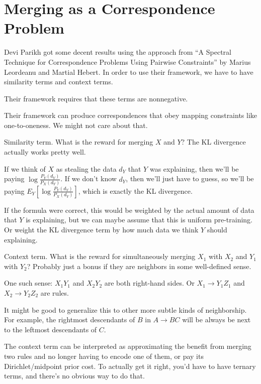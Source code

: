 \section{Merging as a Correspondence Problem}

Devi Parikh got some decent results using the approach from ``A
Spectral Technique for Correspondence Problems Using Pairwise
Constraints'' by Marius Leordeanu and Martial Hebert. In order to use
their framework, we have to have similarity terms and context terms.

Their framework requires that these terms are nonnegative. 

Their framework can produce correspondences that obey mapping
constraints like one-to-oneness. We might not care about that.

\bitem
\item Similarity term. What is the reward for merging $X$ and $Y$? 
  The KL divergence actually works pretty well.

  If we think of $X$ as stealing the data $d_Y$ that $Y$ was
  explaining, then we'll be paying $\log
  \frac{P_Y(d_Y)}{P_X(d_Y)}$. If we don't know $d_Y$, then we'll just
  have to guess, so we'll be paying $E_Y \left[ \log
    \frac{P_Y(d_Y)}{P_X(d_Y)} \right]$, which is exactly the KL
  divergence.

  If the formula were correct, this would be weighted by the actual
  amount of data that $Y$ is explaining, but we can maybe assume that
  this is uniform pre-training. Or weight the KL divergence term by
  how much data we think $Y$ should explaining.

\item Context term. What is the reward for simultaneously merging
  $X_1$ with $X_2$ and $Y_1$ with $Y_2$? Probably just a bonus if they
  are neighbors in some well-defined sense.

  One such sense: $X_1 Y_1$ and $X_2 Y_2$ are both right-hand
  sides. Or $X_1 \to Y_1 Z_1$ and $X_2 \to Y_2 Z_2$ are rules.

  It might be good to generalize this to other more subtle kinds of
  neighborship. For example, the rightmost descendants of $B$ in $A\to
  BC$ will be always be next to the leftmost descendants of $C$.

  The context term can be interpreted as approximating the benefit
  from merging two rules and no longer having to encode one of them,
  or pay its Dirichlet/midpoint prior cost. To actually get it right,
  you'd have to have ternary terms, and there's no obvious way to do
  that.

